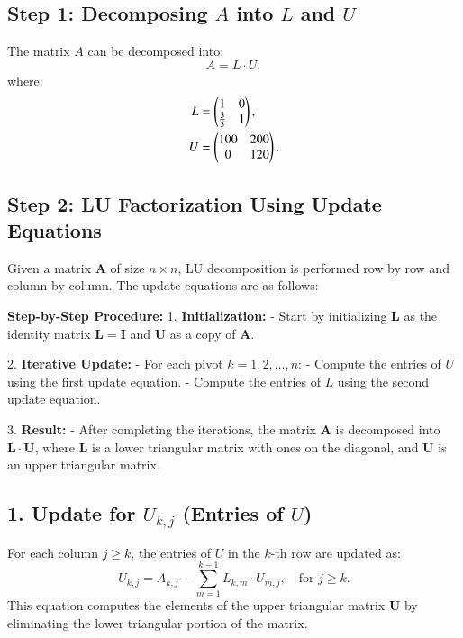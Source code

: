 \documentclass[article]{IEEEtran}
\numberwithin{figure}{enumi}
\begin{document}
\subsection{Step 1: Decomposing \(A\) into \(L\) and \(U\)}
The matrix \(A\) can be decomposed into:
\begin{equation}
    A = L \cdot U,
\end{equation}
where:
\begin{align}
    L &= \begin{pmatrix}1 & 0 \\ \frac{3}{5} & 1\end{pmatrix}, \\
    U &= \begin{pmatrix}100 & 200 \\ 0 & 120\end{pmatrix}.
\end{align}






\subsection*{Step 2: LU Factorization Using Update Equations}
Given a matrix \( \mathbf{A} \) of size \( n \times n \), LU decomposition is performed row by row and column by column. The update equations are as follows:  

\textbf{Step-by-Step Procedure:}
1. \textbf{Initialization:}  
   - Start by initializing \( \mathbf{L} \) as the identity matrix \( \mathbf{L} = \mathbf{I} \) and \( \mathbf{U} \) as a copy of \( \mathbf{A} \).

2. \textbf{Iterative Update:}  
   - For each pivot \( k = 1, 2, \ldots, n \):  
     - Compute the entries of \( U \) using the first update equation.  
     - Compute the entries of \( L \) using the second update equation.  

3. \textbf{Result:}  
   - After completing the iterations, the matrix \( \mathbf{A} \) is decomposed into \( \mathbf{L} \cdot \mathbf{U} \), where \( \mathbf{L} \) is a lower triangular matrix with ones on the diagonal, and \( \mathbf{U} \) is an upper triangular matrix.  

\subsection*{1. Update for \( U_{k,j} \) (Entries of \( U \))}
For each column \( j \geq k \), the entries of \( U \) in the \( k \)-th row are updated as:  
\[
U_{k,j} = A_{k,j} - \sum_{m=1}^{k-1} L_{k,m} \cdot U_{m,j}, \quad \text{for } j \geq k.
\]
This equation computes the elements of the upper triangular matrix \( \mathbf{U} \) by eliminating the lower triangular portion of the matrix.
\end{document}

